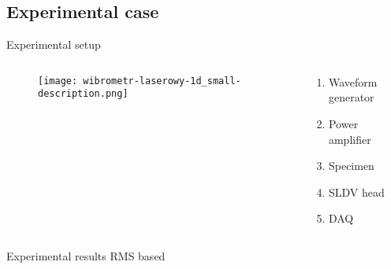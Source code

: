 \documentclass[10pt,aspectratio=169,dvipsnames]{beamer} %
\begin{document}
\subsection{Experimental case}
\setcounter{subfigure}{0}
\begin{frame}{Experimental setup}
	\begin{columns}[T]
		\begin{column}[t]{0.55\textwidth}
			\begin{figure}
				\centering
				\texttt{[image: wibrometr-laserowy-1d\_small-description.png]}
			\end{figure}
		\end{column}
		\begin{column}[t]{0.4\textwidth}
			\begin{enumerate}
				\item Waveform generator
				\item Power amplifier	
				\item Specimen
				\item SLDV head
				\item DAQ
			\end{enumerate}
		\end{column}
	\end{columns}
\end{frame}

\setcounter{subfigure}{0}
\begin{frame}{Experimental results RMS based}
	\centering
	\begin{figure}
		\qquad
		\qquad
		\qquad
		\\
		\qquad
		\qquad
	\end{figure}
\end{frame}
\end{document}
